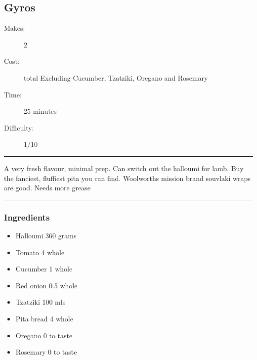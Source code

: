 \documentclass[]{article}
\begin{document}
\subsection*{\center\huge Gyros}
\begin{description}
\item[Makes:] 2 
\item[Cost:]  total Excluding Cucumber, Tzatziki, Oregano and Rosemary
\item[Time:] 25 minutes
\item[Difficulty:] 1/10
\end{description}
\vspace{0.2cm}\hrule\vspace{0.5cm}
\begin{adjustwidth}{0.5 cm}{0.5 cm}

A very fresh flavour, minimal prep. Can switch out the halloumi for lamb. Buy the fanciest, fluffiest pita you can find. Woolworths mission brand souvlaki wraps are good. Needs more grease \hfill{}\color{black}

\end{adjustwidth}
\vspace{0.5cm}\hrule
\subsubsection*{\Large Ingredients}
\begin{multicols}{2}
\begin{itemize}
 \item Halloumi \hfill 360 grams
 \item Tomato \hfill 4 whole
 \item Cucumber \hfill 1 whole
 \item Red onion \hfill 0.5 whole
 \item Tzatziki \hfill 100 mls
 \item Pita bread \hfill 4 whole
 \item Oregano \hfill 0 to taste
 \item Rosemary \hfill 0 to taste
\end{itemize}
\end{multicols}
\end{document}
